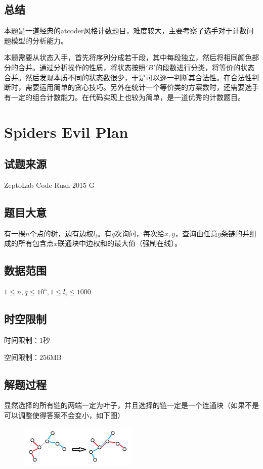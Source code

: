\documentclass[12pt]{article}
\begin{document}
\subsection{总结}
本题是一道经典的atcoder风格计数题目，难度较大，主要考察了选手对于计数问题模型的分析能力。

本题需要从状态入手，首先将序列分成若干段，其中每段独立，然后将相同颜色部分的合并。通过分析操作的性质，将状态按照$'B'$的段数进行分类，将等价的状态合并。然后发现本质不同的状态数很少，于是可以逐一判断其合法性。在合法性判断时，需要运用简单的贪心技巧。另外在统计一个等价类的方案数时，还需要选手有一定的组合计数能力。在代码实现上也较为简单，是一道优秀的计数题目。

\newpage

\section{Spiders Evil Plan}
\subsection{试题来源}
ZeptoLab Code Rush 2015  G
\subsection{题目大意}
有一棵$n$个点的树，边有边权$l_i$。有$q$次询问，每次给$x,y$，查询由任意$y$条链的并组成的所有包含点$x$联通块中边权和的最大值（强制在线）。

\subsection{数据范围}
$1\le n, q\le 10^5, 1\le l_i \le 1000$
\subsection{时空限制}
时间限制：$1$秒

空间限制：$256$MB
\subsection{解题过程}
显然选择的所有链的两端一定为叶子，并且选择的链一定是一个连通块（如果不是可以调整使得答案不会变小，如下图）
\begin{figure}[h] %
    \centering %
    \includegraphics[width=0.5\textwidth]{p1.png} %
    \label{p1} %
\end{figure}%
\end{document}
